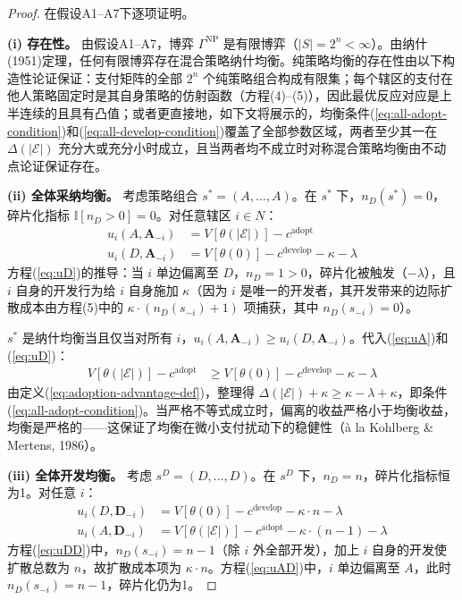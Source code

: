 \documentclass[12pt,a4paper]{ctexart}
\theoremstyle{definition}
\theoremstyle{remark}
\begin{document}
\begin{proof}
在假设A1--A7下逐项证明。

\textbf{(i) 存在性。} 由假设A1--A7，博弈 $\Gamma^{\text{NP}}$ 是有限博弈（$|S| = 2^n < \infty$）。由纳什(1951)定理，任何有限博弈存在混合策略纳什均衡。纯策略均衡的存在性由以下构造性论证保证：支付矩阵的全部 $2^n$ 个纯策略组合构成有限集；每个辖区的支付在他人策略固定时是其自身策略的仿射函数（方程(4)--(5)），因此最优反应对应是上半连续的且具有凸值；或者更直接地，如下文将展示的，均衡条件(\ref{eq:all-adopt-condition})和(\ref{eq:all-develop-condition})覆盖了全部参数区域，两者至少其一在 $\Delta(|\mathcal{E}|)$ 充分大或充分小时成立，且当两者均不成立时对称混合策略均衡由不动点论证保证存在。

\textbf{(ii) 全体采纳均衡。} 考虑策略组合 $s^* = (A, \ldots, A)$。在 $s^*$ 下，$n_D(s^*) = 0$，碎片化指标 $\mathbb{I}[n_D > 0] = 0$。对任意辖区 $i \in N$：
\begin{align}
u_i(A, \mathbf{A}_{-i}) &= V[\theta(|\mathcal{E}|)] - c^{\text{adopt}} \label{eq:uA}\\
u_i(D, \mathbf{A}_{-i}) &= V[\theta(0)] - c^{\text{develop}} - \kappa - \lambda \label{eq:uD}
\end{align}
方程(\ref{eq:uD})的推导：当 $i$ 单边偏离至 $D$，$n_D = 1 > 0$，碎片化被触发（$-\lambda$），且 $i$ 自身的开发行为给 $i$ 自身施加 $\kappa$（因为 $i$ 是唯一的开发者，其开发带来的边际扩散成本由方程(5)中的 $\kappa \cdot (n_D(s_{-i}) + 1)$ 项捕获，其中 $n_D(s_{-i}) = 0$）。

$s^*$ 是纳什均衡当且仅当对所有 $i$，$u_i(A, \mathbf{A}_{-i}) \geq u_i(D, \mathbf{A}_{-i})$。代入(\ref{eq:uA})和(\ref{eq:uD})：
\begin{align}
V[\theta(|\mathcal{E}|)] - c^{\text{adopt}} &\geq V[\theta(0)] - c^{\text{develop}} - \kappa - \lambda
\end{align}
由定义(\ref{eq:adoption-advantage-def})，整理得 $\Delta(|\mathcal{E}|) + \kappa \geq \kappa - \lambda + \kappa$，即条件(\ref{eq:all-adopt-condition})。当严格不等式成立时，偏离的收益严格小于均衡收益，均衡是严格的——这保证了均衡在微小支付扰动下的稳健性（\`{a} la Kohlberg \& Mertens, 1986）。

\textbf{(iii) 全体开发均衡。} 考虑 $s^{D} = (D, \ldots, D)$。在 $s^{D}$ 下，$n_D = n$，碎片化指标恒为1。对任意 $i$：
\begin{align}
u_i(D, \mathbf{D}_{-i}) &= V[\theta(0)] - c^{\text{develop}} - \kappa \cdot n - \lambda \label{eq:uDD}\\
u_i(A, \mathbf{D}_{-i}) &= V[\theta(|\mathcal{E}|)] - c^{\text{adopt}} - \kappa \cdot (n-1) - \lambda \label{eq:uAD}
\end{align}
方程(\ref{eq:uDD})中，$n_D(s_{-i}) = n-1$（除 $i$ 外全部开发），加上 $i$ 自身的开发使扩散总数为 $n$，故扩散成本项为 $\kappa \cdot n$。方程(\ref{eq:uAD})中，$i$ 单边偏离至 $A$，此时 $n_D(s_{-i}) = n-1$，碎片化仍为1。


\end{proof}
\end{document}
